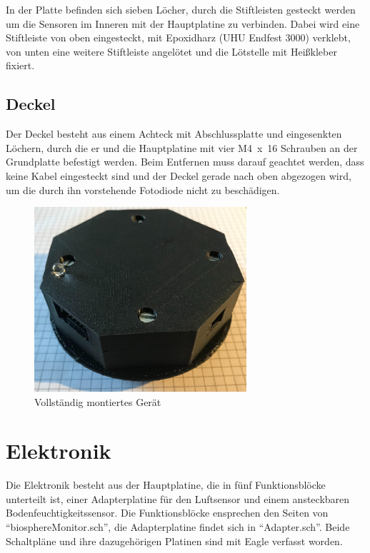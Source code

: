 \documentclass[12pt, a4paper, oneside]{report}
\begin{document}
In der Platte befinden sich sieben Löcher, durch die Stiftleisten gesteckt werden um die Sensoren im Inneren mit der Hauptplatine zu verbinden. Dabei wird eine Stiftleiste von oben eingesteckt, mit Epoxidharz (UHU Endfest 3000) verklebt, von unten eine weitere Stiftleiste angelötet und die Lötstelle mit Heißkleber fixiert.

\section{Deckel}
Der Deckel besteht aus einem Achteck mit Abschlussplatte und eingesenkten Löchern, durch die er und die Hauptplatine mit vier M4~x~16 Schrauben an der Grundplatte befestigt werden. Beim Entfernen muss darauf geachtet werden, dass keine Kabel eingesteckt sind und der Deckel gerade nach oben abgezogen wird, um die durch ihn vorstehende Fotodiode nicht zu beschädigen.
\\
\begin{figure}[h]
	\centering
	\includegraphics[width=0.7\textwidth]{pic/Komplett}
	\caption{Vollständig montiertes Gerät}
	\label{fig:Komplett}
\end{figure}

\chapter{Elektronik}
\label{ch:elektronik}
Die Elektronik besteht aus der Hauptplatine, die in fünf Funktionsblöcke unterteilt ist, einer Adapterplatine für den Luftsensor und einem ansteckbaren Bodenfeuchtigkeitssensor. Die Funktionsblöcke ensprechen den Seiten von "`biosphereMonitor.sch"', die Adapterplatine findet sich in "`Adapter.sch"'. Beide Schaltpläne und ihre dazugehörigen Platinen sind mit Eagle verfasst worden.
\end{document}
